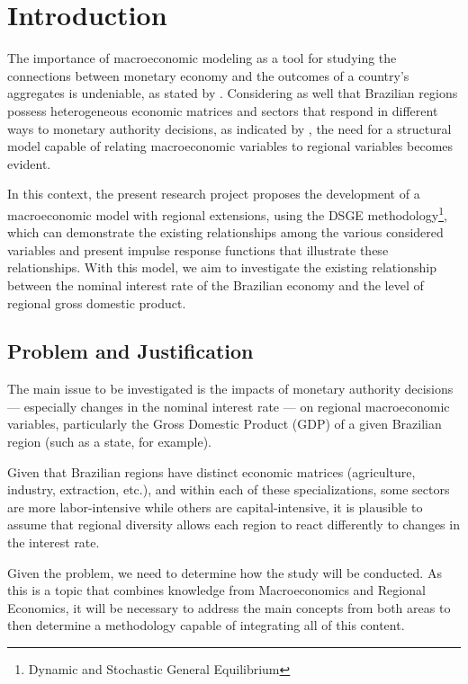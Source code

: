 \documentclass[
thesis.tex
]{subfiles}
\begin{document}
	\newpage

	\section{Introduction}\label{sec:introduction}

	The importance of macroeconomic modeling as a tool for studying the connections between monetary economy and the outcomes of a country's aggregates is undeniable, as stated by \textcite{gali_monetary_2015}. Considering as well that Brazilian regions possess heterogeneous economic matrices and sectors that respond in different ways to monetary authority decisions, as indicated by \textcite{bertanha_efeitos_2008}, the need for a structural model capable of relating macroeconomic variables to regional variables becomes evident.
	
	In this context, the present research project proposes the development of a macroeconomic model with regional extensions, using the DSGE methodology\footnote{Dynamic and Stochastic General Equilibrium}, which can demonstrate the existing relationships among the various considered variables and present impulse response functions that illustrate these relationships. With this model, we aim to investigate the existing relationship between the nominal interest rate of the Brazilian economy and the level of regional gross domestic product.
	
	\subsection*{Problem and Justification}
	
	The main issue to be investigated is the impacts of monetary authority decisions --- especially changes in the nominal interest rate --- on regional macroeconomic variables, particularly the Gross Domestic Product (GDP) of a given Brazilian region (such as a state, for example).
	
	Given that Brazilian regions have distinct economic matrices (agriculture, industry, extraction, etc.), and within each of these specializations, some sectors are more labor-intensive while others are capital-intensive, it is plausible to assume that regional diversity allows each region to react differently to changes in the interest rate.
	
	Given the problem, we need to determine how the study will be conducted. As this is a topic that combines knowledge from Macroeconomics and Regional Economics, it will be necessary to address the main concepts from both areas to then determine a methodology capable of integrating all of this content.
	
\end{document}
